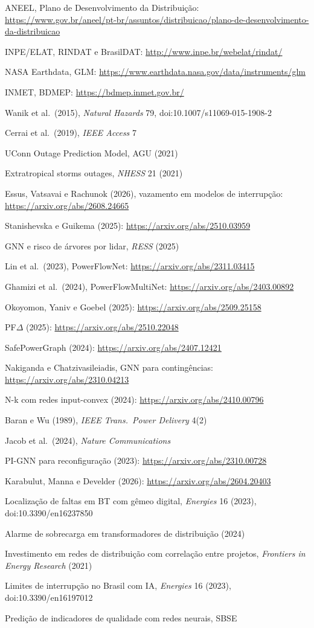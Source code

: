 {\begin{enumerate}[label={[\arabic*]},leftmargin=2.2em,itemsep=1pt]
\item ANEEL, Plano de Desenvolvimento da Distribuição: \url{https://www.gov.br/aneel/pt-br/assuntos/distribuicao/plano-de-desenvolvimento-da-distribuicao}
\item INPE/ELAT, RINDAT e BrasilDAT: \url{http://www.inpe.br/webelat/rindat/}
\item NASA Earthdata, GLM: \url{https://www.earthdata.nasa.gov/data/instruments/glm}
\item INMET, BDMEP: \url{https://bdmep.inmet.gov.br/}
\item Wanik et al.\ (2015), \emph{Natural Hazards} 79, doi:10.1007/s11069-015-1908-2
\item Cerrai et al.\ (2019), \emph{IEEE Access} 7
\item UConn Outage Prediction Model, AGU (2021)
\item Extratropical storms outages, \emph{NHESS} 21 (2021)
\item Essus, Vatsavai e Rachunok (2026), vazamento em modelos de interrupção: \url{https://arxiv.org/abs/2608.24665}
\item Stanishevska e Guikema (2025): \url{https://arxiv.org/abs/2510.03959}
\item GNN e risco de árvores por lidar, \emph{RESS} (2025)
\item Lin et al.\ (2023), PowerFlowNet: \url{https://arxiv.org/abs/2311.03415}
\item Ghamizi et al.\ (2024), PowerFlowMultiNet: \url{https://arxiv.org/abs/2403.00892}
\item Okoyomon, Yaniv e Goebel (2025): \url{https://arxiv.org/abs/2509.25158}
\item PF$\Delta$ (2025): \url{https://arxiv.org/abs/2510.22048}
\item SafePowerGraph (2024): \url{https://arxiv.org/abs/2407.12421}
\item Nakiganda e Chatzivasileiadis, GNN para contingências: \url{https://arxiv.org/abs/2310.04213}
\item N-k com redes input-convex (2024): \url{https://arxiv.org/abs/2410.00796}
\item Baran e Wu (1989), \emph{IEEE Trans.\ Power Delivery} 4(2)
\item Jacob et al.\ (2024), \emph{Nature Communications}
\item PI-GNN para reconfiguração (2023): \url{https://arxiv.org/abs/2310.00728}
\item Karabulut, Manna e Develder (2026): \url{https://arxiv.org/abs/2604.20403}
\item Localização de faltas em BT com gêmeo digital, \emph{Energies} 16 (2023), doi:10.3390/en16237850
\item Alarme de sobrecarga em transformadores de distribuição (2024)
\item Investimento em redes de distribuição com correlação entre projetos, \emph{Frontiers in Energy Research} (2021)
\item Limites de interrupção no Brasil com IA, \emph{Energies} 16 (2023), doi:10.3390/en16197012
\item Predição de indicadores de qualidade com redes neurais, SBSE
\end{enumerate}}
